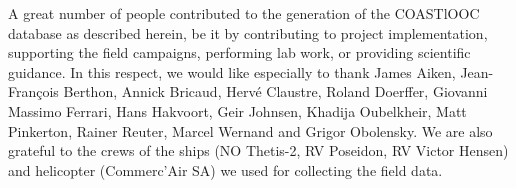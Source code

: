 \documentclass[essd, manuscript]{copernicus}
\begin{document}
\appendixtables   %






\begin{acknowledgements}
    A great number of people contributed to the generation of the COASTlOOC database as described herein, be it by contributing to project implementation, supporting the field campaigns, performing lab work, or providing scientific guidance. In this respect, we would like especially to thank James Aiken, Jean-François Berthon, Annick Bricaud, Hervé Claustre, Roland Doerffer, Giovanni Massimo Ferrari, Hans Hakvoort, Geir Johnsen, Khadija Oubelkheir, Matt Pinkerton, Rainer Reuter, Marcel Wernand and Grigor Obolensky. We are also grateful to the crews of the ships (NO Thetis-2, RV Poseidon, RV Victor Hensen) and helicopter (Commerc'Air SA) we used for collecting the field data.
\end{acknowledgements}





\end{document}

